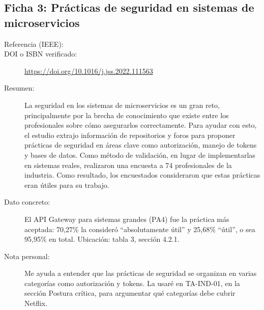 \subsection{Ficha 3: Prácticas de seguridad en sistemas de microservicios}
\begin{description}
  \item[Referencia (IEEE):] 
  \item[DOI o ISBN verificado:] \url{https://doi.org/10.1016/j.jss.2022.111563}
  \item[Resumen:] La seguridad en los sistemas de microservicios es un gran reto, principalmente por la brecha de conocimiento que existe entre los profesionales sobre cómo asegurarlos correctamente. Para ayudar con esto, el estudio extrajo información de repositorios y foros para proponer prácticas de seguridad en áreas clave como autorización, manejo de tokens y bases de datos. Como método de validación, en lugar de implementarlas en sistemas reales, realizaron una encuesta a 74 profesionales de la industria. Como resultado, los encuestados consideraron que estas prácticas eran útiles para su trabajo.
  \item[Dato concreto:] El API Gateway para sistemas grandes (PA4) fue la práctica más aceptada: 70,27\% la consideró “absolutamente útil” y 25,68\% “útil”, o sea 95,95\% en total. Ubicación: tabla 3, sección 4.2.1. 
  \item[Nota personal:] Me ayuda a entender que las prácticas de seguridad se organizan en varias categorías como autorización y tokens. La usaré en TA-IND-01, en la sección Postura crítica, para argumentar qué categorías debe cubrir Netflix.
\end{description}

